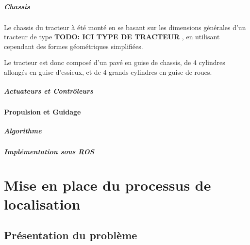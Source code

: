 \documentclass[12pt,a4paper]{report}
\begin{document}
			\paragraph{Chassis}
			Le chassis du tracteur à été monté en se basant sur les dimensions générales d'un tracteur de type \textbf{TODO: ICI TYPE DE TRACTEUR} , en utilisant cependant des formes géométriques simplifiées.
			\newline
			
			Le tracteur est donc composé d'un pavé en guise de chassis, de 4 cylindres allongés en guise d'essieux, et de 4 grands cylindres en guise de roues.
			
			\paragraph{Actuateurs et Contrôleurs}
		\subsubsection{Propulsion et Guidage}
			\paragraph{Algorithme}
			
			
			\paragraph{Implémentation sous ROS}
			
		
		

\chapter{Mise en place du processus de localisation}

	\section{Présentation du problème}
	
\end{document}
